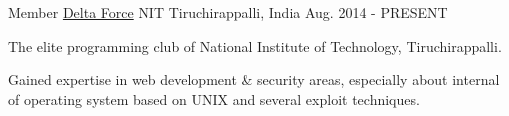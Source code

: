 \begin{cventries}
  \cventry
    {Member}
    {\href{https://github.com/delta}{Delta Force}}
    {NIT Tiruchirappalli, India}
    {Aug. 2014 - PRESENT}
    {
      \begin{cvitems}
        \item { The elite programming club of National Institute of Technology, Tiruchirappalli.}
        \item {Gained expertise in web development \& security areas, especially about internal of operating system based on UNIX and several exploit techniques.}
      \end{cvitems}
    }
  
\end{cventries}
